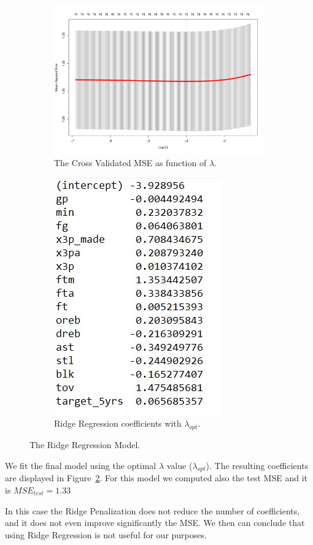 \begin{figure}[h]
	\centering
	\begin{subfigure}{.6\textwidth}
		\centering
		\includegraphics[width=0.7\linewidth]{ImageFiles/Regression/Ridge/RidgeCvPlot}
		\caption{The Cross Validated MSE as function of $\lambda$.}
		\label{fig:RidgeCvPlot}
	\end{subfigure}%
	\begin{subfigure}{.6\textwidth}
		\centering
		\includegraphics[width=0.4\linewidth]{ImageFiles/Regression/Ridge/FinalRidgeCoef}
		\caption{Ridge Regression coefficients with $\lambda_{opt}$.}
		\label{fig:FinalRidgeCoef}
	\end{subfigure}
	\caption{The Ridge Regression Model.}
	\label{fig:FinalRidgeModel}
\end{figure}

We fit the final model using the optimal $\lambda$ value ($\lambda_{opt}$). The resulting coefficients are displayed in Figure~\ref{fig:FinalRidgeCoef}. For this model we computed also the test MSE and it is $MSE_{test} = 1.33$

In this case the Ridge Penalization does not reduce the number of coefficients, and it does not even improve significantly the MSE. We then can conclude that using Ridge Regression is not useful for our purposes.
